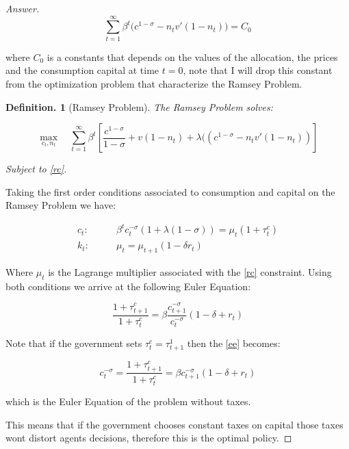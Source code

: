 \documentclass[12pt]{article}
\newtheorem{defin}{Definition.}
\theoremstyle{definition}
\begin{document}
\begin{proof}[Answer]
\begin{equation}\tag{IC}\label{impconst}
    \sum_{t=1}^\infty \beta^t\Big(c^{1-\sigma} - n_t v'(1-n_t)\Big) = C_0
\end{equation}

where $C_0$ is a constants that depends on the values of the allocation, the prices and the consumption capital at time $t=0$, note that I will drop this constant from the optimization problem that characterize the Ramsey Problem.

\begin{defin}[Ramsey Problem] The Ramsey Problem solves:

$$\max_{c_t, n_t}\quad \sum_{t=1}^\infty \beta^t\left[\frac{c^{1-\sigma}}{1-\sigma}+v(1-n_t)+\lambda((c^{1-\sigma} - n_t v'(1-n_t))\right]$$

Subject to \eqref{rc}.
\end{defin}

Taking the first order conditions associated to consumption and capital on the Ramsey Problem we have:

\begin{align*}
    c_t:&\qquad \beta^tc_t^{-\sigma}(1+\lambda(1-\sigma)) = \mu_t(1+\tau_t^c)\\
    k_t:&\qquad \mu_t = \mu_{t+1}(1-\delta r_t)
\end{align*}

Where $\mu_t$ is the Lagrange multiplier associated with the \eqref{rc} constraint. Using both conditions we arrive at the following Euler Equation:

\begin{equation}\tag{EE}\label{ee}
    \frac{1+\tau_{t+1}^c}{1+\tau_{t}^c}=\beta\frac{c_{t+1}^{-\sigma}}{c_{t}^{-\sigma}}(1-\delta+r_t)
\end{equation}

Note that if the government sets $\tau_t^c = \tau_{t+1}^1$ then the \eqref{ee} becomes:

$$c_{t}^{-\sigma}=\frac{1+\tau_{t+1}^c}{1+\tau_{t}^c}=\beta c_{t+1}^{-\sigma}(1-\delta+r_t)$$

which is the Euler Equation of the problem without taxes.

This means that if the government chooses constant taxes on capital those taxes wont distort agents decisions, therefore this is the optimal policy.  

\end{proof}
\end{document}
